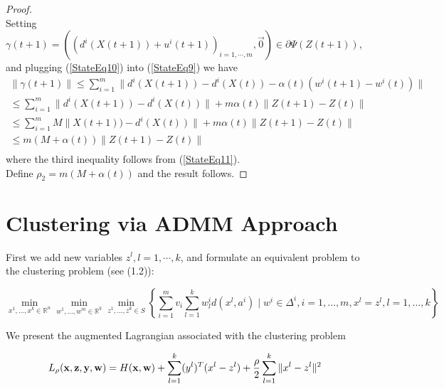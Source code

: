 \documentclass[11pt]{article}
\numberwithin{equation}{section}
\begin{document}
\begin{proof}
\begin{equation}
\end{equation}
Setting $\gamma(t+1) = \left( \left( d^i(X(t+1)) + u^i(t+1) \right)_{i=1, \cdots ,m}, \vec{0} \right) \in \partial \Psi(Z(t+1))$, and plugging (\ref{StateEq10}) into (\ref{StateEq9}) we have
\begin{equation*}
	\begin{split}
	\| \gamma(t+1) \|
	\leq \sum\limits_{i=1}^{m} \| d^i(X(t+1)) - d^i(X(t)) - \alpha(t) \left( w^i(t+1) - w^i(t) \right) \| \\
	\leq \sum\limits_{i=1}^{m} \| d^i(X(t+1)) - d^i(X(t)) \| + m \alpha(t) \|Z(t+1) - Z(t)\| \\
	\leq \sum\limits_{i=1}^{m} M \| X(t+1)) - d^i(X(t)) \| + m \alpha(t) \|Z(t+1) - Z(t)\| \\
	\leq m \left( M + \alpha(t) \right) \|Z(t+1) - Z(t)\| \\
	\end{split}
\end{equation*}
where the third inequality follows from (\ref{StateEq11}). \\
Define $\rho_2 = m \left( M + \alpha(t) \right)$ and the result follows.
\end{proof}

\newpage

\section{Clustering via ADMM Approach }

First we add new variables $z^l, l=1, \cdots ,k$, and formulate an equivalent problem to the clustering problem (see (1.2)):

\begin{equation}
	\min\limits_{x^1, \dots ,x^k \in \mathbb{R}^n} \min\limits_{w^1, \dots ,w^m \in \mathbb{R}^k} \min\limits_{z^1, \dots ,z^k \in S} \left\lbrace \sum\limits_{i=1}^{m} v_i \sum\limits_{l=1}^{k} w^i_l d(x^l , a^i) \mid w^i \in \Delta^i , i=1, \dots ,m , x^l = z^l, l=1, \dots ,k \right\rbrace
\end{equation}

We present the augmented Lagrangian associated with the clustering problem

\begin{equation}
	L_\rho({\bf x},{\bf z},{\bf y},{\bf w}) = H({\bf x},{\bf w}) + \sum\limits_{l=1}^k (y^l)^T (x^l -z^l) + \frac{\rho}{2} \sum\limits_{l=1}^k \| x^l -z^l \|^2
\end{equation}
\end{document}
